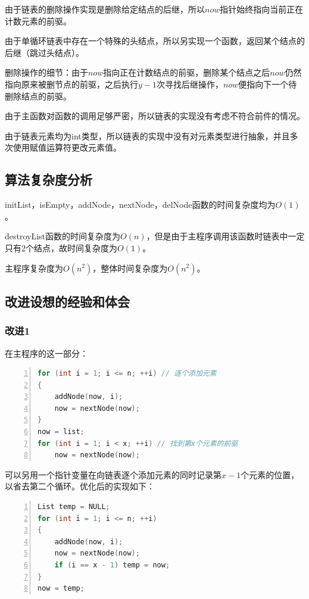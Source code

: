 \documentclass{article}
\begin{document}
由于链表的删除操作实现是删除给定结点的后继，所以$now$指针始终指向当前正在计数元素的前驱。

由于单循环链表中存在一个特殊的头结点，所以另实现一个函数，返回某个结点的后继（跳过头结点）。

删除操作的细节：由于$now$指向正在计数结点的前驱，删除某个结点之后$now$仍然指向原来被删节点的前驱，之后执行$y-1$次寻找后继操作，$now$便指向下一个待删除结点的前驱。

由于主函数对函数的调用足够严密，所以链表的实现没有考虑不符合前件的情况。

由于链表元素均为int类型，所以链表的实现中没有对元素类型进行抽象，并且多次使用赋值运算符更改元素值。

\subsection{算法复杂度分析}

initList，isEmpty，addNode，nextNode，delNode函数的时间复杂度均为$O(1)$。

destroyList函数的时间复杂度为$O(n)$，但是由于主程序调用该函数时链表中一定只有2个结点，故时间复杂度为$O(1)$。

主程序复杂度为$O(n^2)$，整体时间复杂度为$O(n^2)$。

\subsection{改进设想的经验和体会}

\subsubsection{改进1}

在主程序的这一部分：

\begin{lstlisting}[language={C},
    numbers=left,
    numberstyle=\tiny\menlo,
    basicstyle=\small\menlo]
for (int i = 1; i <= n; ++i) // 逐个添加元素
{
    addNode(now, i);
    now = nextNode(now);
}
now = list;
for (int i = 1; i < x; ++i) // 找到第x个元素的前驱
    now = nextNode(now);
\end{lstlisting}

可以另用一个指针变量在向链表逐个添加元素的同时记录第$x-1$个元素的位置，以省去第二个循环。优化后的实现如下：

\begin{lstlisting}[language={C},
    numbers=left,
    numberstyle=\tiny\menlo,
    basicstyle=\small\menlo]
List temp = NULL;
for (int i = 1; i <= n; ++i)
{
    addNode(now, i);
    now = nextNode(now);
    if (i == x - 1) temp = now;
}
now = temp;
\end{lstlisting}
\end{document}

